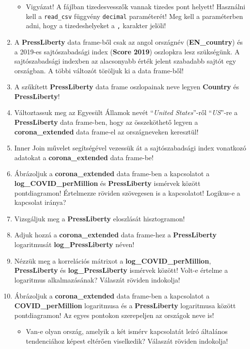 \documentclass[
]{book}
\providecommand{\tightlist}{%
  \setlength{\itemsep}{0pt}\setlength{\parskip}{0pt}}
\begin{document}
\begin{enumerate}
  \begin{itemize}
  \tightlist
  \item
    Vigyázat! A fájlban tizedesvesszők vannak tizedes pont helyett! Használni kell a \texttt{read\_csv} függvény \texttt{decimal} paraméterét! Meg kell a paraméterben adni, hogy a tizedeshelyeket a \texttt{\textquotesingle{},\textquotesingle{}} karakter jelöli!
  \end{itemize}
\item
  A \textbf{PressLiberty} data frame-ből csak az angol országnév (\textbf{EN\_country}) és a 2019-es sajtószabadsági index (\textbf{Score 2019}) oszlopkra lesz szükségünk. A sajtószabadsági indexben az alacsonyabb érték jelent szabadabb sajtót egy országban. A többi változót töröljuk ki a data frame-ből!
\item
  A szűkített \textbf{PressLiberty} data frame oszlopainak neve legyen \textbf{Country} és \textbf{PressLiberty}!
\item
  Változtassuk meg az Egyesült Államok nevét ``\emph{United States}''-ről ``\emph{US}''-re a \textbf{PressLiberty} data frame-ben, hogy az összeköthető legyen a \textbf{corona\_extended} data frame-el az országneveken keresztül!
\item
  Inner Join művelet segítségével vezessük át a sajtószabadsági index vonatkozó adatokat a \textbf{corona\_extended} data frame-be!
\item
  Ábrázoljuk a \textbf{corona\_extended} data frame-ben a kapcsolatot a \textbf{log\_COVID\_perMillion} és \textbf{PressLiberty} ismérvek között pontdiagramon! Értelmezze röviden szövegesen is a kapcsolatot! Logikus-e a kapcsolat iránya?
\item
  Vizsgáljuk meg a \textbf{PressLiberty} eloszlását hisztogramon!
\item
  Adjuk hozzá a \textbf{corona\_extended} data frame-hez a \textbf{PressLiberty} logaritmusát \textbf{log\_PressLiberty} néven!
\item
  Nézzük meg a korrelációs mátrixot a \textbf{log\_COVID\_perMillion}, \textbf{PressLiberty} és \textbf{log\_PressLiberty} ismérvek között! Volt-e értelme a logaritmus alkalmazásának? Válaszát röviden indokolja!
\item
  Ábrázoljuk a \textbf{corona\_extended} data frame-ben a kapcsolatot a \textbf{COVID\_perMillion} logaritmusa és a \textbf{PressLiberty} logaritmusa között pontdiagramon! Az egyes pontokon szerepeljen az országok neve is!

  \begin{itemize}
  \tightlist
  \item
    Van-e olyan ország, amelyik a két ismérv kapcsolatát leíró általános tendenciához képest eltérően viselkedik? Válaszát röviden indokolja!
  \end{itemize}
\end{enumerate}
\end{document}
